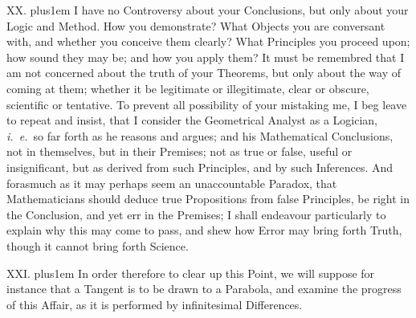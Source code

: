 \medbreak

XX. \hskip 0pt plus1em
I have no Controversy about your Conclusions, but only about your
Logic and Method.  How you demonstrate?  What Objects you are
conversant with, and whether you conceive them clearly?  What
Principles you proceed upon; how sound they may be; and how you
apply them?  It must be remembred that I am not concerned about
the truth of your Theorems, but only about the way of coming at
them; whether it be legitimate or illegitimate, clear or obscure,
scientific or tentative.  To prevent all possibility of your
mistaking me, I beg leave to repeat and insist, that I consider
the Geometrical Analyst as a Logician, {\it i.~e.}\ so far forth
as he reasons and argues; and his Mathematical Conclusions, not
in themselves, but in their Premises; not as true or false,
useful or insignificant, but as derived from such Principles, and
by such Inferences.  And forasmuch as it may perhaps seem an
unaccountable Paradox, that Mathematicians should deduce true
Propositions from false Principles, be right in the Conclusion,
and yet err in the Premises; I shall endeavour particularly to
explain why this may come to pass, and shew how Error may bring
forth Truth, though it cannot bring forth Science.

\medbreak

XXI. \hskip 0pt plus1em
In order therefore to clear up this Point, we will suppose for
instance that a Tangent is to be drawn to a Parabola, and examine
the progress of this Affair, as it is performed by infinitesimal
Differences.

\midinsert
\centerline{}
\endinsert

